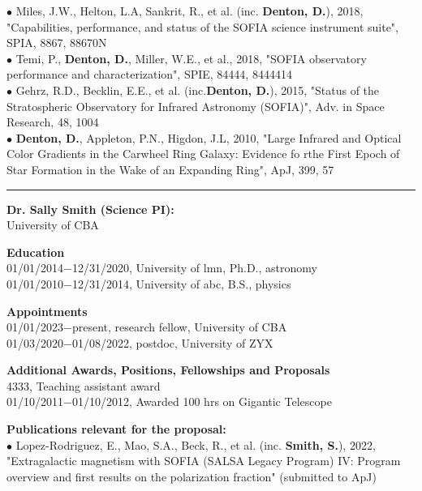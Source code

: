 {\scriptsize{$\bullet$}} Miles, J.W., Helton, L.A, Sankrit, R., et al. (inc. \textbf{Denton, D.}), 2018, "Capabilities, performance, and status of the SOFIA science instrument suite", SPIA, 8867, 88670N\\
{\scriptsize{$\bullet$}} Temi, P., \textbf{Denton, D.}, Miller, W.E., et al., 2018, "SOFIA observatory performance and characterization", SPIE, 84444, 8444414\\
{\scriptsize{$\bullet$}} Gehrz, R.D., Becklin, E.E., et al. (inc.\textbf{Denton, D.}), 2015, "Status of the Stratospheric Observatory for Infrared Astronomy (SOFIA)", Adv. in Space Research, 48, 1004\\
{\scriptsize{$\bullet$}} \textbf{Denton, D.}, Appleton, P.N., Higdon, J.L, 2010, "Large Infrared and Optical Color Gradients in the Carwheel Ring Galaxy: Evidence fo rthe First Epoch of Star Formation in the Wake of an Expanding Ring", ApJ, 399, 57
\medskip \hrule \vspace{5pt} \medskip
\textbf{\color{Blue}\large Dr. Sally Smith (Science PI):}\\
University of CBA
\par \vspace{-0.5em}
\textbf{Education}\\
01/01/2014$-$12/31/2020, University of lmn, Ph.D., astronomy\\
01/01/2010$-$12/31/2014, University of abc, B.S., physics
\par \vspace{-0.5em}
\textbf{Appointments}\\
01/01/2023$-$present, research fellow, University of CBA\\
01/03/2020$-$01/08/2022, postdoc, University of ZYX
\par \vspace{-0.5em}
\textbf{Additional Awards, Positions, Fellowships and Proposals}\\
4333, Teaching assistant award\\
01/10/2011$-$01/10/2012, Awarded 100 hrs on Gigantic Telescope
\par \vspace{-0.5em}
\textbf{Publications relevant for the proposal:}\\
{\scriptsize{$\bullet$}} Lopez-Rodriguez, E., Mao, S.A., Beck, R., et al. (inc. \textbf{Smith, S.}), 2022, "Extragalactic magnetism with SOFIA (SALSA Legacy Program) IV: Program overview and first results on the polarization fraction" (submitted to ApJ)\\
